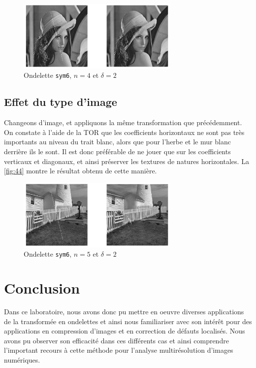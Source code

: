 \documentclass[12pt]{article}
\begin{document}
\begin{figure}[!h]
	\centering
	\includegraphics[width = 0.7\textwidth]{images/43sym6copie2}
	\caption{Ondelette \texttt{sym6}, $n=4$ et $\delta=2$}
	\label{fig:43}
\end{figure}


\subsection{Effet du type d'image}
Changeons d'image, et appliquons la même transformation que précédemment. On constate à
l'aide de la TOR que les coefficients horizontaux ne sont pas très importants au niveau
du trait blanc, alors que pour l'herbe et le mur blanc derrière ils le sont. Il est
donc préférable de ne jouer que sur les coefficients verticaux et diagonaux, et ainsi
préserver les textures de natures horizontales. La \autoref{fig:44} montre le résultat
obtenu de cette manière.

\begin{figure}[!h]
	\centering
	\includegraphics[width = 0.7\textwidth]{images/44sym6copie1}
	\caption{Ondelette \texttt{sym6}, $n=5$ et $\delta=2$}
	\label{fig:44}
\end{figure}

\section{Conclusion}
Dans ce laboratoire, nous avons donc pu mettre en oeuvre diverses applications de la
transformée en ondelettes et ainsi nous familiariser avec son intérêt pour des
applications en compression d'images et en correction de défauts localisés. Nous avons
pu observer son efficacité dans ces différents cas et ainsi comprendre l'important
recours à cette méthode pour l'analyse multirésolution d'images numériques.
\end{document}
